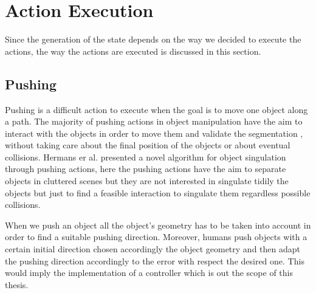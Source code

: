


\section{Action Execution}
Since the generation of the state depends on the way we decided to execute the actions, the way the actions are executed is discussed in this section.   

\subsection{Pushing}
\label{subsec:pushing}

Pushing is a difficult action to execute when the goal is to move one object along a path. The majority of pushing actions in object manipulation have the aim to interact with the objects in order to move them and validate the segmentation \citep{katz2014perceiving} \citep{katz2011interactive} \citep{Katz_2013_7407} , without taking care about the final position of the objects or about eventual collisions. Hermans er al. \citep{conf/iros/HermansRB12} presented a novel algorithm for object singulation through pushing actions, here the pushing actions have the aim to separate objects in cluttered scenes but they are not interested in singulate tidily the objects but just to find a feasible interaction to singulate them regardless possible collisions. 


When we push an object all the object's geometry has to be taken into account in order to find a suitable pushing direction. Moreover, humans push objects with a certain initial direction chosen accordingly the object geometry and then adapt the pushing direction accordingly to the error with respect the desired one. This would imply the implementation of a controller which is out the scope of this thesis. 


